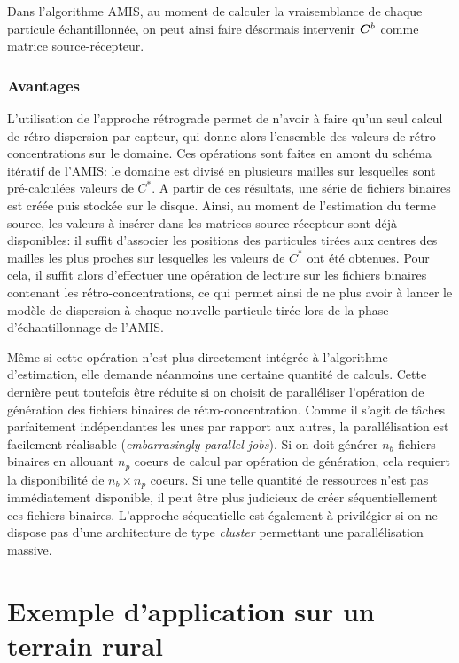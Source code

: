 Dans l'algorithme AMIS, au moment de calculer la vraisemblance de chaque particule échantillonnée, on peut ainsi faire désormais intervenir ${\bm{C}}^b$ comme matrice source-récepteur.

\subsubsection{Avantages}

{L'utilisation de l'approche rétrograde} permet de n'avoir à faire qu'un seul calcul de rétro-dispersion par capteur, qui donne alors l'ensemble des valeurs de rétro-concentrations sur le domaine. {Ces opérations sont faites en amont du schéma itératif de l'AMIS: le domaine est divisé en plusieurs mailles sur lesquelles sont pré-calculées valeurs de $C^*$. A partir de ces résultats, une série de fichiers binaires est créée puis stockée sur le disque. Ainsi, au moment de l'estimation du terme source, les valeurs à insérer dans les matrices source-récepteur sont déjà disponibles: il suffit d'associer les positions des particules tirées aux centres des mailles les plus proches sur lesquelles les valeurs de $C^*$ ont été obtenues. Pour cela, il suffit alors d'effectuer une opération de lecture sur les fichiers binaires contenant les rétro-concentrations, ce qui permet ainsi de ne plus avoir à lancer le modèle de dispersion à chaque nouvelle particule tirée lors de la phase d'échantillonnage de l'AMIS.\\}

Même si cette opération n'est plus directement intégrée à l'algorithme d'estimation, elle demande néanmoins une certaine quantité de calculs. Cette dernière peut toutefois être réduite si on choisit de paralléliser l'opération de génération des fichiers binaires de rétro-concentration. Comme il s'agit de tâches parfaitement indépendantes les unes par rapport aux autres, la parallélisation est facilement réalisable (\textit{embarrasingly parallel jobs}). Si on doit générer $n_b$ fichiers binaires en allouant $n_p$ coeurs de calcul par opération de génération, cela requiert la disponibilité de $n_b \times n_p$ coeurs. Si une telle quantité de ressources n'est pas immédiatement disponible, il peut être plus judicieux de créer séquentiellement ces fichiers binaires. L'approche séquentielle est également à privilégier si on ne dispose pas d'une architecture de type \textit{cluster} permettant une parallélisation massive. 
\newpage
{
\section{Exemple d'application sur un terrain rural}
}

